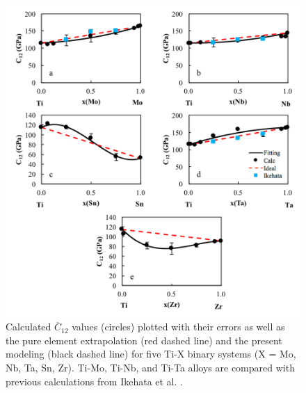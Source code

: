 \pagebreak
\begin{figure}[H]
	\centering
	\includegraphics[width=\textwidth]{Chapter-5/Figures/tixc12.png}
	\caption{Calculated $\overline{C}_{12}$ values (circles) plotted with their errors as well as the pure element extrapolation (red dashed line) and the present modeling (black dashed line) for five Ti-X binary systems (X = Mo, Nb, Ta, Sn, Zr). Ti-Mo, Ti-Nb, and Ti-Ta alloys are compared with previous calculations from Ikehata et al. \cite{Ikehata2004}.}
	\label{Ch5-figure:tixc12}
\end{figure}

